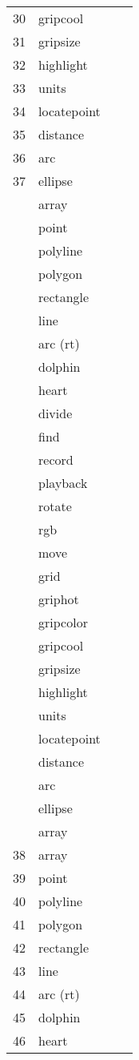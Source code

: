 \begin{longtable}{l l l p{8cm}}
30 & gripcool &  & \\
31 & gripsize &  & \\
32 & highlight &  & \\
33 & units &  & \\
34 & locatepoint &  & \\
35 & distance &  & \\
36 & arc &  & \\
37 & ellipse &  & \\
 & array & & \\
 & point & & \\
 & polyline & & \\
 & polygon & & \\
 & rectangle & & \\
 & line & & \\
 & arc (rt) & & \\
 & dolphin & & \\
 & heart & & \\
 & divide & & \\
 & find & & \\
 & record & & \\
 & playback & & \\
 & rotate & & \\
 & rgb & & \\
 & move & & \\
 & grid & & \\
 & griphot & & \\
 & gripcolor & & \\
 & gripcool & & \\
 & gripsize & & \\
 & highlight & & \\
 & units & & \\
 & locatepoint & & \\
 & distance & & \\
 & arc & & \\
 & ellipse & & \\
 & array & & \\
38 & array &  & \\
39 & point &  & \\
40 & polyline &  & \\
41 & polygon &  & \\
42 & rectangle &  & \\
43 & line &  & \\
44 & arc (rt) &  & \\
45 & dolphin &  & \\
46 & heart &  &
\end{longtable}

